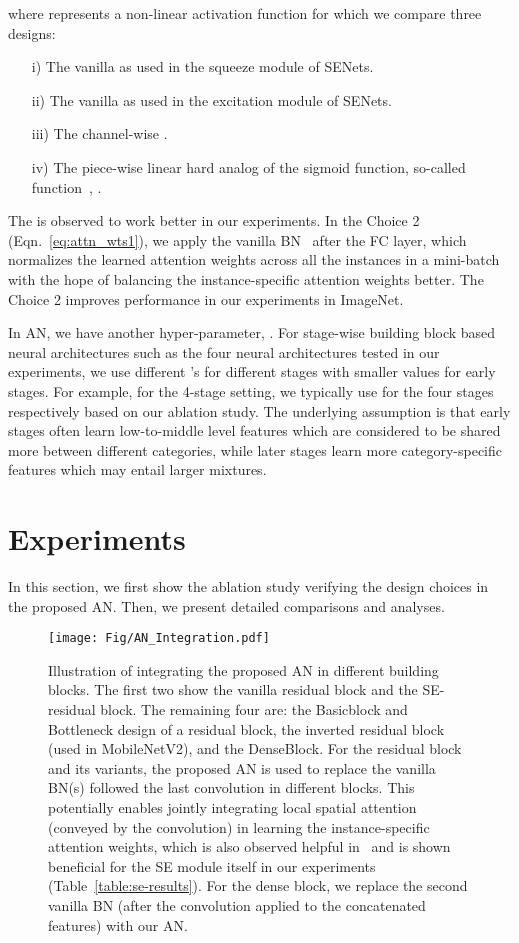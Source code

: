\documentclass[runningheads]{llncs}
\begin{document}
where  represents a non-linear activation function for which we compare three designs: 
\begin{itemize}
\item [i)] The vanilla  as used in the squeeze module of SENets.
\item [ii)] The vanilla  as used in the excitation module of SENets.  
\item [iii)] The channel-wise . 
\item [iv)] The piece-wise linear hard analog of the sigmoid function, so-called  function~\cite{mobilenetv3}, .
\end{itemize}
The  is observed to work better in our experiments. In the Choice 2 (Eqn.~\ref{eq:attn_wts1}), we apply the vanilla BN~\cite{BatchNorm} after the FC layer, which normalizes the learned attention weights across all the instances in a mini-batch with the hope of balancing the instance-specific attention weights better. The Choice 2 improves performance in our experiments in ImageNet.   



In AN, we have another hyper-parameter, . For stage-wise building block based neural architectures such as the four neural architectures tested in our experiments, we use different 's for different stages with smaller values for early stages. For example, for the 4-stage setting, we typically use  for the four stages respectively based on our ablation study. The underlying assumption is that early stages often learn low-to-middle level features which are considered to be shared more between different categories, while later stages learn more category-specific features which may entail larger mixtures. 



\section{Experiments}\label{sec:exp}
In this section, we first show the ablation study verifying the design choices in the proposed AN. Then, we present detailed comparisons and analyses. 


\begin{figure} [t]
    \centering
    \texttt{[image: Fig/AN\_Integration.pdf]}
    \caption{Illustration of integrating the proposed AN in different building blocks. The first two show the vanilla residual block and the SE-residual block. The remaining four are: the Basicblock and Bottleneck design of a residual block, the inverted residual block (used in MobileNetV2), and the DenseBlock. 
For the residual block and its variants, the proposed AN is used to replace the vanilla BN(s) followed the last  convolution in different blocks. This potentially enables  jointly  integrating  local  spatial  attention (conveyed by the  convolution) in  learning the instance-specific attention weights, which is also observed helpful in~\cite{SWhitenning} and is shown beneficial for the SE module itself in our experiments (Table~\ref{table:se-results}). For the dense block, we replace the second vanilla BN (after the  convolution applied to the concatenated features) with our AN. 
    }\label{fig:ResBlockAN}
\end{figure}
\end{document}
